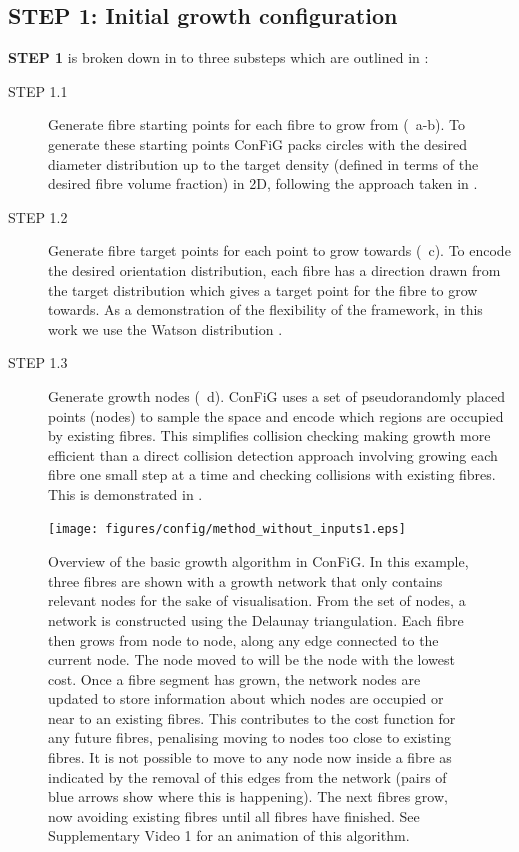 \subsection{STEP 1: Initial growth configuration}
\label{sec:ipmi_step1_details}
\textbf{\sffamily STEP 1} is broken down in to three substeps which are outlined in :
\begin{description}
  \item [STEP 1.1] Generate fibre starting points for each fibre to grow from (~a-b). To generate these starting points ConFiG packs circles with the desired diameter distribution up to the target density (defined in terms of the desired fibre volume fraction) in 2D, following the approach taken in \cite{Hall2009}.

  \item [STEP 1.2] Generate fibre target points for each point to grow towards (~c). To encode the desired orientation distribution, each fibre has a direction drawn from the target distribution which gives a target point for the fibre to grow towards. As a demonstration of the flexibility of the framework, in this work we use the Watson distribution \cite{Mardia2008}.

  \item [STEP 1.3] Generate growth nodes (~d). ConFiG uses a set of pseudorandomly placed points (nodes) to sample the space and encode which regions are occupied by existing fibres. This simplifies collision checking making growth more efficient than a direct collision detection approach involving growing each fibre one small step at a time and checking collisions with existing fibres. This is demonstrated in .
\end{description}

\begin{figure}[h!]
  \centering
  \texttt{[image: figures/config/method\_without\_inputs1.eps]}
  \caption[Overview of the ConFiG growth algorithm]{Overview of the basic growth algorithm in ConFiG. In this example, three fibres are shown with a growth network that only contains relevant nodes for the sake of visualisation.  From the set of nodes, a network is constructed using the Delaunay triangulation. Each fibre then grows from node to node, along any edge connected to the current node. The node moved to will be the node with the lowest cost. Once a fibre segment has grown, the network nodes are updated to store information about which nodes are occupied or near to an existing fibres. This contributes to the cost function for any future fibres, penalising moving to nodes too close to existing fibres.  It is not possible to move to any node now inside a fibre as indicated by the removal of this edges from the network (pairs of blue arrows show where this is happening). The next fibres grow, now avoiding existing fibres until all fibres have finished. See Supplementary Video 1 for an animation of this algorithm. }
  \label{fig:ipmi_config_algorithm}
\end{figure}


